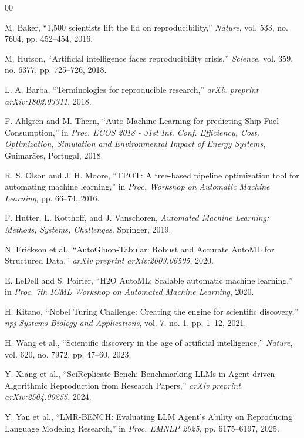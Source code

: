 \documentclass[conference]{IEEEtran}
\begin{document}
\begin{thebibliography}{00}

M. Baker, ``1,500 scientists lift the lid on reproducibility,'' \textit{Nature}, vol. 533, no. 7604, pp. 452--454, 2016.

M. Hutson, ``Artificial intelligence faces reproducibility crisis,'' \textit{Science}, vol. 359, no. 6377, pp. 725--726, 2018.

L. A. Barba, ``Terminologies for reproducible research,'' \textit{arXiv preprint arXiv:1802.03311}, 2018.

F. Ahlgren and M. Thern, ``Auto Machine Learning for predicting Ship Fuel Consumption,'' in \textit{Proc. ECOS 2018 - 31st Int. Conf. Efficiency, Cost, Optimization, Simulation and Environmental Impact of Energy Systems}, Guimar\~{a}es, Portugal, 2018.

R. S. Olson and J. H. Moore, ``TPOT: A tree-based pipeline optimization tool for automating machine learning,'' in \textit{Proc. Workshop on Automatic Machine Learning}, pp. 66--74, 2016.

F. Hutter, L. Kotthoff, and J. Vanschoren, \textit{Automated Machine Learning: Methods, Systems, Challenges}. Springer, 2019.

N. Erickson et al., ``AutoGluon-Tabular: Robust and Accurate AutoML for Structured Data,'' \textit{arXiv preprint arXiv:2003.06505}, 2020.

E. LeDell and S. Poirier, ``H2O AutoML: Scalable automatic machine learning,'' in \textit{Proc. 7th ICML Workshop on Automated Machine Learning}, 2020.

H. Kitano, ``Nobel Turing Challenge: Creating the engine for scientific discovery,'' \textit{npj Systems Biology and Applications}, vol. 7, no. 1, pp. 1--12, 2021.

H. Wang et al., ``Scientific discovery in the age of artificial intelligence,'' \textit{Nature}, vol. 620, no. 7972, pp. 47--60, 2023.

Y. Xiang et al., ``SciReplicate-Bench: Benchmarking LLMs in Agent-driven Algorithmic Reproduction from Research Papers,'' \textit{arXiv preprint arXiv:2504.00255}, 2024.

Y. Yan et al., ``LMR-BENCH: Evaluating LLM Agent's Ability on Reproducing Language Modeling Research,'' in \textit{Proc. EMNLP 2025}, pp. 6175--6197, 2025.


\end{thebibliography}
\end{document}
